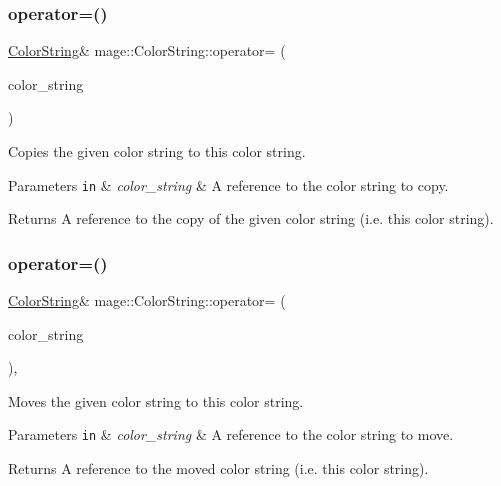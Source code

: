 \subsubsection{\texorpdfstring{operator=()}{operator=()}\hspace{0.1cm}{\footnotesize\ttfamily [1/2]}}
{\footnotesize\ttfamily \hyperlink{classmage_1_1_color_string}{Color\+String}\& mage\+::\+Color\+String\+::operator= (\begin{DoxyParamCaption}\item[{const \hyperlink{classmage_1_1_color_string}{Color\+String} \&}]{color\+\_\+string }\end{DoxyParamCaption})\hspace{0.3cm}{\ttfamily [default]}}

Copies the given color string to this color string.


\begin{DoxyParams}[1]{Parameters}
\mbox{\tt in}  & {\em color\+\_\+string} & A reference to the color string to copy. \\
\hline
\end{DoxyParams}
\begin{DoxyReturn}{Returns}
A reference to the copy of the given color string (i.\+e. this color string). 
\end{DoxyReturn}
\hypertarget{classmage_1_1_color_string_aa909f18891bd31a23f2b7c877806bef1}{}\label{classmage_1_1_color_string_aa909f18891bd31a23f2b7c877806bef1} 
\subsubsection{\texorpdfstring{operator=()}{operator=()}\hspace{0.1cm}{\footnotesize\ttfamily [2/2]}}
{\footnotesize\ttfamily \hyperlink{classmage_1_1_color_string}{Color\+String}\& mage\+::\+Color\+String\+::operator= (\begin{DoxyParamCaption}\item[{\hyperlink{classmage_1_1_color_string}{Color\+String} \&\&}]{color\+\_\+string }\end{DoxyParamCaption})\hspace{0.3cm}{\ttfamily [default]}, {\ttfamily [noexcept]}}

Moves the given color string to this color string.


\begin{DoxyParams}[1]{Parameters}
\mbox{\tt in}  & {\em color\+\_\+string} & A reference to the color string to move. \\
\hline
\end{DoxyParams}
\begin{DoxyReturn}{Returns}
A reference to the moved color string (i.\+e. this color string). 
\end{DoxyReturn}
\hypertarget{classmage_1_1_color_string_ae735ab55789bb21741c6ad3c8115a146}{}\label{classmage_1_1_color_string_ae735ab55789bb21741c6ad3c8115a146} 
